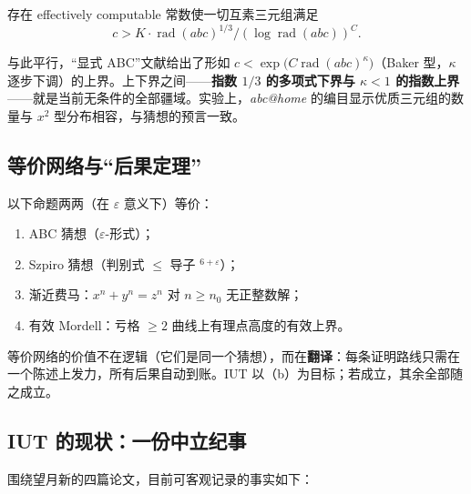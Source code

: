 \begin{theorem}\label{thm:lowerbounds}
    存在 effectively computable 常数使一切互素三元组满足
    \begin{equation}
        c > K \cdot \operatorname{rad}(abc)^{1/3}\big/(\log \operatorname{rad}(abc))^{C} .
    \end{equation}
\end{theorem}

\noindent 与此平行，“显式 ABC”文献给出了形如 $c < \exp\bigl(C \operatorname{rad}(abc)^{\kappa}\bigr)$（Baker 型，$\kappa$ 逐步下调）的上界。上下界之间——\textbf{指数 $1/3$ 的多项式下界与 $\kappa < 1$ 的指数上界}——就是当前无条件的全部疆域。实验上，\textit{abc@home} 的编目显示优质三元组的数量与 $x^{2}$ 型分布相容，与猜想的预言一致。

\subsection{等价网络与“后果定理”}

\begin{theorem}\label{thm:network}
    以下命题两两（在 $\varepsilon$ 意义下）等价：
    \begin{enumerate}[label=(\alph*)]
        \item ABC 猜想（$\varepsilon$-形式）；
        \item Szpiro 猜想（判别式 $\leq$ 导子 $^{6+\varepsilon}$）；
        \item 渐近费马：$x^n + y^n = z^n$ 对 $n \geq n_0$ 无正整数解；
        \item 有效 Mordell：亏格 $\geq 2$ 曲线上有理点高度的有效上界。
    \end{enumerate}
\end{theorem}

\noindent 等价网络的价值不在逻辑（它们是同一个猜想），而在\textbf{翻译}：每条证明路线只需在一个陈述上发力，所有后果自动到账。IUT 以（b）为目标；若成立，其余全部随之成立。

\subsection{IUT 的现状：一份中立纪事}\label{sec:iut-status}

围绕望月新的四篇论文\cite{mochizuki2012}，目前可客观记录的事实如下：

